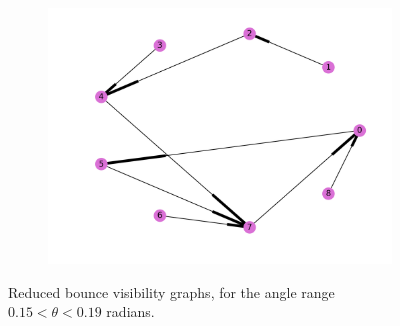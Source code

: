 \documentclass[]{article}  %
\begin{document}
\begin{figure}
\begin{subfigure}{0.33\textwidth}
  \includegraphics[width=\linewidth]{figures/reduced_graph2.png}
\end{subfigure}
\caption{Reduced bounce visibility graphs, for the angle range $0.15 < \theta <
0.19$ radians.}
\end{figure}
\end{document}
